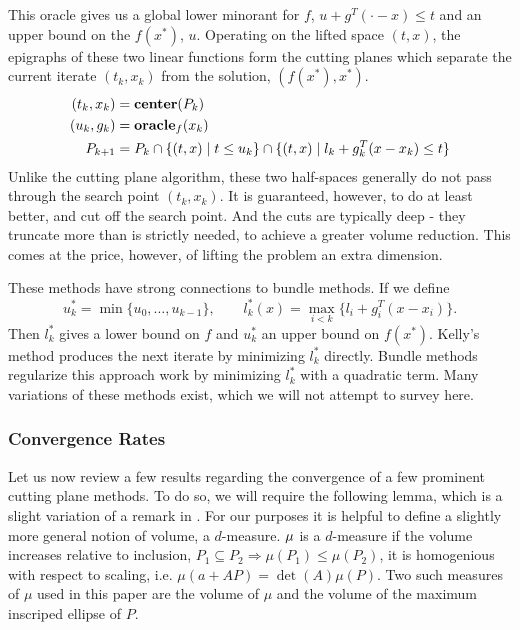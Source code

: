 This oracle gives us a global lower minorant for $f$, $u + g^T(\cdot - x) \leq t$ and an upper bound on the $f(x^*)$, $u$. Operating on the lifted space $(t,x)$, the epigraphs of these two linear functions form the cutting planes which separate the current iterate $(t_k, x_k)$ from the solution, $(f(x^*), x^*)$. 
\begin{align*}
(t_{k},x_{k}) & =\mbox{\textbf{center}}(P_{k})\\
(u_{k},g_{k}) & = \mbox{\bf oracle}_f(x_{k})\\
P_{k+1} & =P_{k}\cap\{(t,x)\mid t\leq u_{k}\}\cap\{(t,x)\mid l_{k}+g_{k}^{T}(x-x_{k})\leq t\}
\end{align*}
Unlike the cutting plane algorithm, these two half-spaces generally do not
pass through the search point $(t_k, x_k)$. It is guaranteed, however, to do
at least better, and cut off the search point. And the cuts are typically deep - they truncate more than is strictly needed, to achieve a greater volume reduction. This comes at the price, however, of lifting the problem an extra dimension.

These methods have strong connections to bundle methods. If we define
$$
u^*_k = \min{ \{ u_0, \dots, u_{k-1}\} }, \qquad 
l^*_k(x) = \max_{i < k}\{l_i + g_i^T(x-x_i)\}.
$$Then $l^*_k$ gives a lower bound on $f$ and $u_k^*$ an upper bound on $f(x^*)$. Kelly's method \cite{kelley1960cutting} produces the next iterate by minimizing $l^*_k$ directly. Bundle methods \cite{lemarechal1975extension,wolfe1975method} regularize this approach work by minimizing $l_k^*$ with a quadratic term. Many variations of these methods exist, which we will not attempt to survey here.

\subsubsection{Convergence Rates}

Let us now review a few results regarding the convergence of a few prominent
cutting plane methods. To do so, we will require the following lemma, which is a slight variation of a remark in \cite{tarasov1988method}. For our purposes it is helpful to define a slightly more general notion of volume, a $d$-measure. $\mu$ is a $d$-measure if the volume increases relative to inclusion, $P_1 \subseteq P_2 \Rightarrow \mu(P_1) \leq \mu(P_2)$, it is homogenious with respect to scaling, i.e. $\mu(a+AP)=\det(A)\mu(P)$. Two such measures of $\mu$ used in this paper are the volume of $\mu$ and the volume of the maximum inscriped ellipse of $P$.

